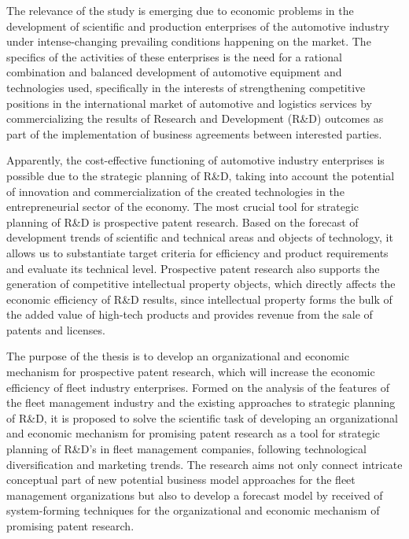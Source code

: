 \documentclass[12pt,twoside]{reedthesis}
\begin{document}
The relevance of the study is emerging due to economic problems in the development of scientific and production enterprises of the automotive industry under intense-changing prevailing conditions happening on the market. The specifics of the activities of these enterprises is the need for a rational combination and balanced development of automotive equipment and technologies used, specifically in the interests of strengthening competitive positions in the international market of automotive and logistics services by commercializing the results of Research and Development (R\&D) outcomes as part of the implementation of business agreements between interested parties.

Apparently, the cost-effective functioning of automotive industry enterprises is possible due to the strategic planning of R\&D, taking into account the potential of innovation and commercialization of the created technologies in the entrepreneurial sector of the economy. The most crucial tool for strategic planning of R\&D is prospective patent research. Based on the forecast of development trends of scientific and technical areas and objects of technology, it allows us to substantiate target criteria for efficiency and product requirements and evaluate its technical level. Prospective patent research also supports the generation of competitive intellectual property objects, which directly affects the economic efficiency of R\&D results, since intellectual property forms the bulk of the added value of high-tech products and provides revenue from the sale of patents and licenses.

The purpose of the thesis is to develop an organizational and economic mechanism for prospective patent research, which will increase the economic efficiency of fleet industry enterprises. Formed on the analysis of the features of the fleet management industry and the existing approaches to strategic planning of R\&D, it is proposed to solve the scientific task of developing an organizational and economic mechanism for promising patent research as a tool for strategic planning of R\&D's in fleet management companies, following technological diversification and marketing trends. The research aims not only connect intricate conceptual part of new potential business model approaches for the fleet management organizations but also to develop a forecast model by received of system-forming techniques for the organizational and economic mechanism of promising patent research.
\end{document}
